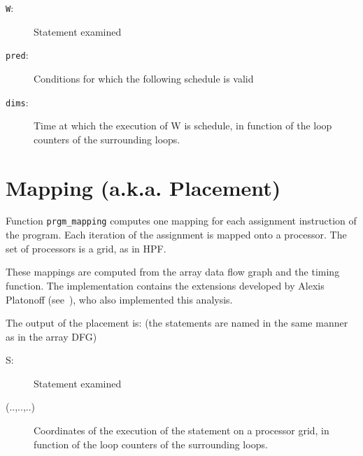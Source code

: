 \documentclass[a4paper]{report}
\newenvironment{PipsMake}{\begin{alltt}}{\end{alltt}}
\begin{document}
\begin{description}
\item[\texttt{W}:] Statement examined
\item[\texttt{pred}:] Conditions for which the following schedule is
  valid
\item[\texttt{dims}:] Time at which the execution of W is schedule, in function of
  the loop counters of the surrounding loops.
\end{description}






\section{Mapping (a.k.a. Placement)}

Function \verb+prgm_mapping+ computes one mapping for
each assignment instruction of the program. Each iteration of the
assignment is mapped onto a processor. The set of processors is a grid,
as in HPF.

These mappings are computed from the array data flow graph and the timing
function. The implementation contains the extensions developed by Alexis
Platonoff (see~\cite{Fea93,Pla95b}), who also implemented this analysis.

The output of the placement is:
(the statements are named in the same manner as in the array DFG)

\begin{description}
\item[S:] Statement examined
\item[(..,..,..)]  Coordinates of the execution of the statement on a
  processor grid, in function of the loop counters of the surrounding
  loops.
\end{description}

\end{document}
